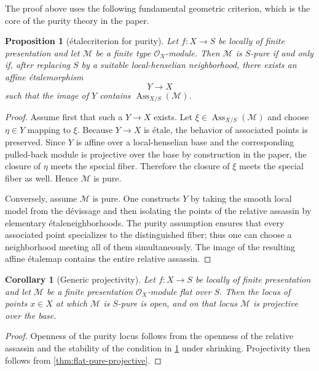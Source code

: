 \documentclass[11pt,oneside]{article}
\newtheorem{proposition}[theorem]{Proposition}
\newtheorem{corollary}[theorem]{Corollary}
\newcommand{\M}{\mathcal M}
\newcommand{\OO}{\mathcal O}
\newcommand{\Ass}{\operatorname{Ass}}
\newcommand{\etale}{\'etale}
\begin{document}
The proof above uses the following fundamental geometric criterion, which is the core of the purity theory in the paper.

\begin{proposition}[\etale criterion for purity]\label{prop:etale-assassin}
Let $f\colon X\to S$ be locally of finite presentation and let $\M$ be a finite type $\OO_X$-module.  Then $\M$ is $S$-pure if and only if, after replacing $S$ by a suitable local-henselian neighborhood, there exists an affine \etale morphism
\[
Y\to X
\]
such that the image of $Y$ contains $\Ass_{X/S}(\M)$.
\end{proposition}

\begin{proof}
Assume first that such a $Y\to X$ exists.  Let $\xi\in\Ass_{X/S}(\M)$ and choose $\eta\in Y$ mapping to $\xi$.  Because $Y\to X$ is \etale, the behavior of associated points is preserved.  Since $Y$ is affine over a local-henselian base and the corresponding pulled-back module is projective over the base by construction in the paper, the closure of $\eta$ meets the special fiber.  Therefore the closure of $\xi$ meets the special fiber as well.  Hence $\M$ is pure.

Conversely, assume $\M$ is pure.  One constructs $Y$ by taking the smooth local model from the d\'evissage and then isolating the points of the relative assassin by elementary \etale neighborhoods.  The purity assumption ensures that every associated point specializes to the distinguished fiber; thus one can choose a neighborhood meeting all of them simultaneously.  The image of the resulting affine \etale map contains the entire relative assassin.
\end{proof}

\begin{corollary}[Generic projectivity]\label{cor:generic-proj}
Let $f\colon X\to S$ be locally of finite presentation and let $\M$ be a finite presentation $\OO_X$-module flat over $S$.  Then the locus of points $x\in X$ at which $\M$ is $S$-pure is open, and on that locus $\M$ is projective over the base.
\end{corollary}

\begin{proof}
Openness of the purity locus follows from the openness of the relative assassin and the stability of the condition in \cref{prop:etale-assassin} under shrinking.  Projectivity then follows from \cref{thm:flat-pure-projective}.
\end{proof}
\end{document}

